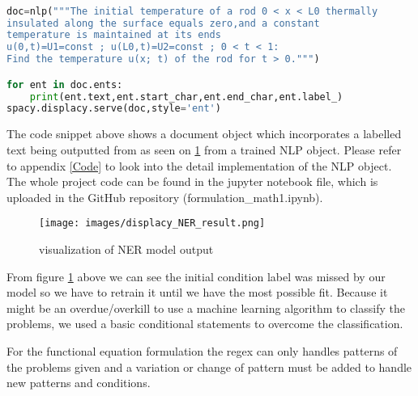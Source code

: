 \lstset{style=mystyle}
\begin{lstlisting}[language=python]

doc=nlp("""The initial temperature of a rod 0 < x < L0 thermally 
insulated along the surface equals zero,and a constant 
temperature is maintained at its ends 
u(0,t)=U1=const ; u(L0,t)=U2=const ; 0 < t < 1: 
Find the temperature u(x; t) of the rod for t > 0.""")   

for ent in doc.ents: 
    print(ent.text,ent.start_char,ent.end_char,ent.label_)
spacy.displacy.serve(doc,style='ent')
\end{lstlisting}
\newpage
The code snippet above shows a document object which incorporates a labelled text being outputted from as seen on \ref{fig:NLP Visulaizationl} from a trained NLP object. Please refer to appendix \ref{Code} to look into the detail implementation of the NLP object. The whole project code can be found in the jupyter notebook file, which is uploaded in the GitHub repository (formulation\_math1.ipynb).

\begin{figure}[hbt!]
    \centering
    \texttt{[image: images/displacy\_NER\_result.png]}
    \caption{visualization of NER model output}
    \label{fig:NLP Visulaizationl}
\end{figure} 
From figure \ref{fig:NLP Visulaizationl} above we can see the initial condition label was missed by our model so we have to retrain it until we have the most possible fit. 
Because it might be an overdue/overkill  to use a machine learning algorithm to classify the problems, we used a basic conditional statements to overcome the classification.

For the functional equation formulation the regex can only handles patterns of the problems given and a variation or change of pattern must be added to handle new patterns and conditions. 